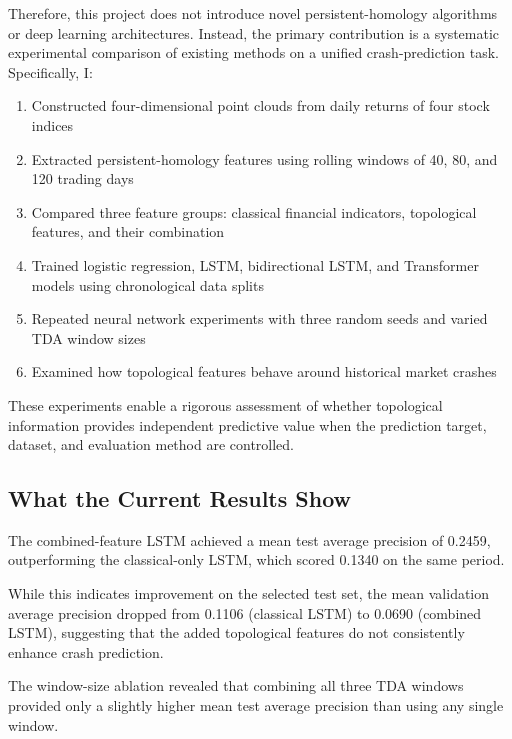 \documentclass[oneside,english,11pt]{article}
\begin{document}
Therefore, this project does not introduce novel persistent-homology algorithms or deep learning architectures. Instead, the primary contribution is a systematic experimental comparison of existing methods on a unified crash-prediction task. Specifically, I:

\begin{enumerate}[leftmargin=*]

\item Constructed four-dimensional point clouds from daily returns of four stock indices

\item Extracted persistent-homology features using rolling windows of 40, 80, and 120 trading days

\item Compared three feature groups: classical financial indicators, topological features, and their combination

\item Trained logistic regression, LSTM, bidirectional LSTM, and Transformer models using chronological data splits

\item Repeated neural network experiments with three random seeds and varied TDA window sizes

\item Examined how topological features behave around historical market crashes

\end{enumerate}

These experiments enable a rigorous assessment of whether topological information provides independent predictive value when the prediction target, dataset, and evaluation method are controlled.


\subsection{What the Current Results Show}


The combined-feature LSTM achieved a mean test average precision of 0.2459, outperforming the classical-only LSTM, which scored 0.1340 on the same period.

While this indicates improvement on the selected test set, the mean validation average precision dropped from 0.1106 (classical LSTM) to 0.0690 (combined LSTM), suggesting that the added topological features do not consistently enhance crash prediction.

The window-size ablation revealed that combining all three TDA windows provided only a slightly higher mean test average precision than using any single window. 
\end{document}
